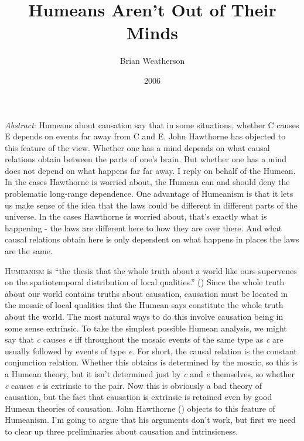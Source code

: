 \documentclass[
  11pt,
  letterpaper,
  DIV=11,
  numbers=noendperiod,
  twoside]{scrartcl}
\title{Humeans Aren't Out of Their Minds}
\author{Brian Weatherson}
\date{2006}
\renewenvironment{abstract}
 {\vspace{-1.25cm}
 \quotation\small\noindent\emph{Abstract}:}
 {\endquotation}
\renewenvironment{abstract}
 {\quotation\small\noindent\emph{Abstract}:}
 {\endquotation\vspace{-0.02cm}}
\begin{document}
\maketitle
\begin{abstract}
Humeans about causation say that in some situations, whether C causes E
depends on events far away from C and E. John Hawthorne has objected to
this feature of the view. Whether one has a mind depends on what causal
relations obtain between the parts of one's brain. But whether one has a
mind does not depend on what happens far far away. I reply on behalf of
the Humean. In the cases Hawthorne is worried about, the Humean can and
should deny the problematic long-range dependence. One advantage of
Humeanism is that it lets us make sense of the idea that the laws could
be different in different parts of the universe. In the cases Hawthorne
is worried about, that's exactly what is happening - the laws are
different here to how they are over there. And what causal relations
obtain here is only dependent on what happens in places the laws are the
same.
\end{abstract}


\lettrine{H}{umeanism} is ``the thesis that the whole truth about a
world like ours supervenes on the spatiotemporal distribution of local
qualities.'' () Since the
whole truth about our world contains truths about causation, causation
must be located in the mosaic of local qualities that the Humean says
constitute the whole truth about the world. The most natural ways to do
this involve causation being in some sense extrinsic. To take the
simplest possible Humean analysis, we might say that \emph{c} causes
\emph{e} iff throughout the mosaic events of the same type as \emph{c}
are usually followed by events of type \emph{e}. For short, the causal
relation is the constant conjunction relation. Whether this obtains is
determined by the mosaic, so this is a Humean theory, but it isn't
determined just by \emph{c} and \emph{e} themselves, so whether \emph{c}
causes \emph{e} is extrinsic to the pair. Now this is obviously a bad
theory of causation, but the fact that causation is extrinsic is
retained even by good Humean theories of causation. John Hawthorne
() objects to this feature of
Humeanism. I'm going to argue that his arguments don't work, but first
we need to clear up three preliminaries about causation and
intrinsicness.
\end{document}
